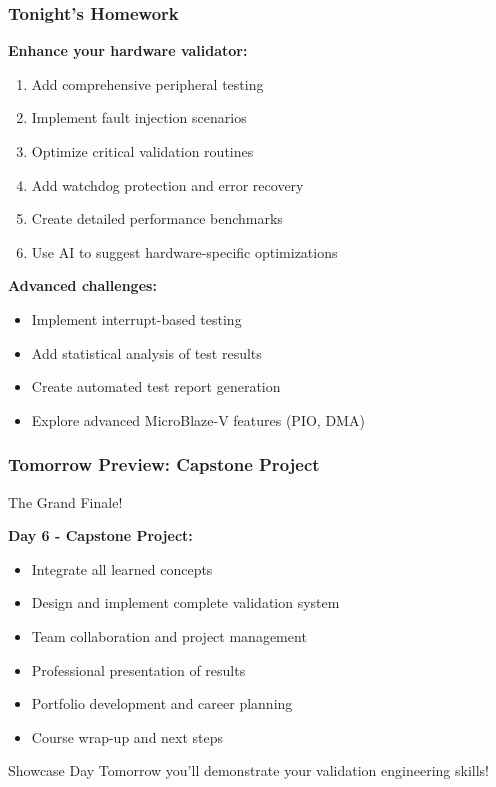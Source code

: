\documentclass{beamer}
\begin{document}
\begin{frame}
\frametitle{Tonight's Homework}
\textbf{Enhance your hardware validator:}
\begin{enumerate}
    \item \footnotesize Add comprehensive peripheral testing
    \item \footnotesize Implement fault injection scenarios
    \item \footnotesize Optimize critical validation routines
    \item \footnotesize Add watchdog protection and error recovery
    \item \footnotesize Create detailed performance benchmarks
    \item \footnotesize Use AI to suggest hardware-specific optimizations
\end{enumerate}

\vspace{0.5cm}
\textbf{Advanced challenges:}
\begin{itemize}
    \item \footnotesize Implement interrupt-based testing
    \item \footnotesize Add statistical analysis of test results
    \item \footnotesize Create automated test report generation
    \item \footnotesize Explore advanced MicroBlaze-V features (PIO, DMA)
\end{itemize}
\end{frame}

\begin{frame}
\frametitle{Tomorrow Preview: Capstone Project}
\begin{center}
\Large The Grand Finale!
\end{center}

\textbf{Day 6 - Capstone Project:}
\begin{itemize}
    \item Integrate all learned concepts
    \item Design and implement complete validation system
    \item Team collaboration and project management
    \item Professional presentation of results
    \item Portfolio development and career planning
    \item Course wrap-up and next steps
\end{itemize}

\vspace{0.5cm}
\begin{alertblock}{Showcase Day}
Tomorrow you'll demonstrate your validation engineering skills!
\end{alertblock}
\end{frame}
\end{document}
